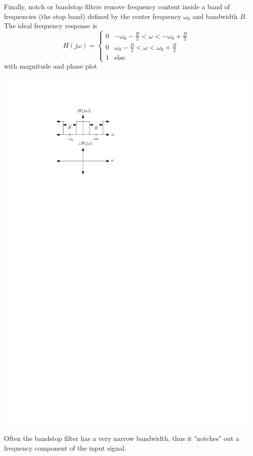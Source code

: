 Finally, notch or bandstop filters remove frequency content inside a band of frequencies (the stop band) defined by the center frequency $\omega_0$ and bandwidth $B$. The ideal frequency response is
\[
H(j\omega) = \left\{ \begin{array}{lc}
  0 & -\omega_0 - \frac{B}{2} < \omega < -\omega_0+\frac{B}{2}\\[1em]
  0 & \omega_0 -\frac{B}{2} < \omega < \omega_0+\frac{B}{2}\\[1em]
  1 & \text{else}
\end{array}
\right. 
\]
with magnitude and phase plot
\begin{center}
  \includegraphics[scale=1]{graphics/bandstop-ideal.pdf}
\end{center}
Often the bandstop filter has a very narrow bandwidth, thus it "notches" out a frequency component of the input signal.

